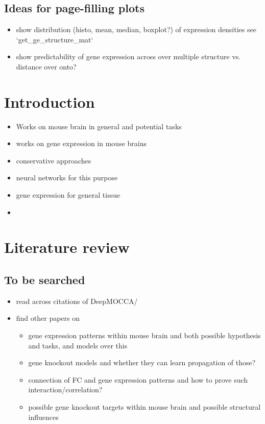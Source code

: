 \documentclass[]{article}
\begin{document}
\subsection*{Ideas for page-filling plots}
\begin{itemize}
	\item show distribution (histo, mean, median, boxplot?) of expression densities see `get\_ge\_structure\_mat`
	\item show predictability of gene expression across over multiple structure vs. distance over onto?
\end{itemize}

\newpage

\section{Introduction}

\begin{itemize}
	\item Works on mouse brain in general and potential tasks
	\item works on gene expression in mouse brains
	\item conservative approaches
	\item neural networks for this purpose
	\item gene expression for general tissue
	
\end{itemize}

\begin{itemize}
	\item 
\end{itemize}

\section{Literature review}

\subsection{To be searched}
\begin{itemize}
	\item read across citations of DeepMOCCA/\citet{takata_flexible_2021}
	\item find other papers on
	\begin{itemize}
		\item gene expression patterns within mouse brain and both possible hypothesis and tasks, and models over this
		\item gene knockout models and whether they can learn propagation of those?
		\item connection of FC and gene expression patterns and how to prove such interaction/correlation?
		\item possible gene knockout targets within mouse brain and possible structural influences
	\end{itemize}
\end{itemize}
\end{document}
